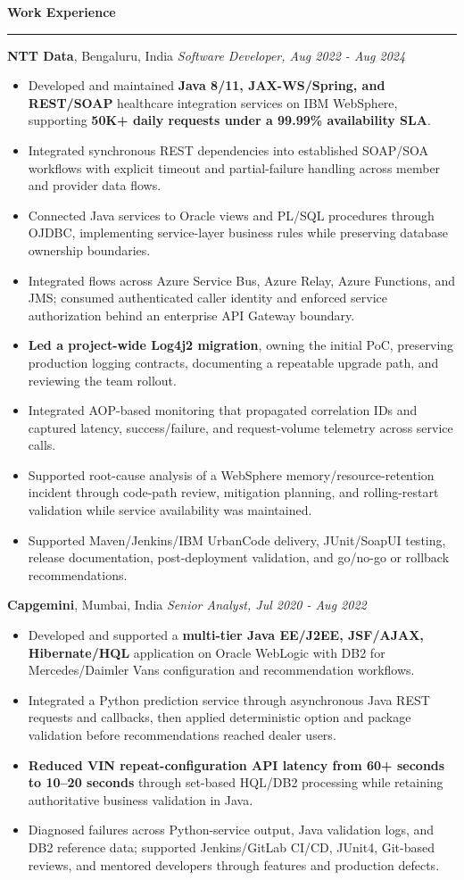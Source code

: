 \documentclass[11pt,letterpaper]{article}
\newcommand{\ressection}[1]{\Needspace{6\baselineskip}\vspace{8pt}\par\textbf{#1}\par\vspace{2pt}\hrule\vspace{5pt}}
\begin{document}
\ressection{Work Experience}
\textbf{NTT Data}, Bengaluru, India \hfill \textit{Software Developer, Aug 2022 - Aug 2024}
\begin{itemize}
  \item Developed and maintained \textbf{Java 8/11, JAX-WS/Spring, and REST/SOAP} healthcare integration services on IBM WebSphere, supporting \textbf{50K+ daily requests under a 99.99\% availability SLA}.
  \item Integrated synchronous REST dependencies into established SOAP/SOA workflows with explicit timeout and partial-failure handling across member and provider data flows.
  \item Connected Java services to Oracle views and PL/SQL procedures through OJDBC, implementing service-layer business rules while preserving database ownership boundaries.
  \item Integrated flows across Azure Service Bus, Azure Relay, Azure Functions, and JMS; consumed authenticated caller identity and enforced service authorization behind an enterprise API Gateway boundary.
  \item \textbf{Led a project-wide Log4j2 migration}, owning the initial PoC, preserving production logging contracts, documenting a repeatable upgrade path, and reviewing the team rollout.
  \item Integrated AOP-based monitoring that propagated correlation IDs and captured latency, success/failure, and request-volume telemetry across service calls.
  \item Supported root-cause analysis of a WebSphere memory/resource-retention incident through code-path review, mitigation planning, and rolling-restart validation while service availability was maintained.
  \item Supported Maven/Jenkins/IBM UrbanCode delivery, JUnit/SoapUI testing, release documentation, post-deployment validation, and go/no-go or rollback recommendations.
\end{itemize}
\textbf{Capgemini}, Mumbai, India \hfill \textit{Senior Analyst, Jul 2020 - Aug 2022}
\begin{itemize}
  \item Developed and supported a \textbf{multi-tier Java EE/J2EE, JSF/AJAX, Hibernate/HQL} application on Oracle WebLogic with DB2 for Mercedes/Daimler Vans configuration and recommendation workflows.
  \item Integrated a Python prediction service through asynchronous Java REST requests and callbacks, then applied deterministic option and package validation before recommendations reached dealer users.
  \item \textbf{Reduced VIN repeat-configuration API latency from 60+ seconds to 10--20 seconds} through set-based HQL/DB2 processing while retaining authoritative business validation in Java.
  \item Diagnosed failures across Python-service output, Java validation logs, and DB2 reference data; supported Jenkins/GitLab CI/CD, JUnit4, Git-based reviews, and mentored developers through features and production defects.
\end{itemize}
\end{document}
